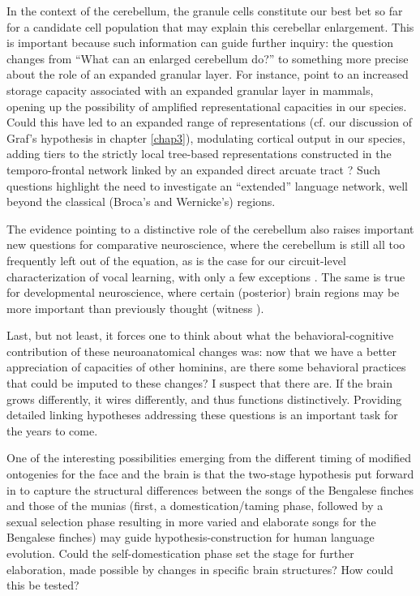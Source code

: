 In the context of the cerebellum, the granule cells constitute our best bet so far for a candidate cell population that may explain this cerebellar enlargement. This is important because such information can guide further inquiry: the question changes from ``What can an enlarged cerebellum do?'' to something more precise about the role of an expanded granular layer. For instance, \cite{straub2020gradients} point to an increased storage capacity associated with an expanded granular layer in mammals, opening up the possibility of amplified representational capacities in our species. Could this have led to an expanded range of representations (cf. our discussion of Graf's hypothesis in chapter \ref{chap3}), modulating cortical output in our species, adding tiers to the strictly local tree-based representations constructed in the temporo-frontal network linked by an expanded direct arcuate tract \citep{rilling2008evolution,friederici2017language,eichert2019special,balezeau2020primate}? Such questions highlight the need to investigate an ``extended'' language network, well beyond the classical (Broca's and Wernicke's) regions.

The evidence pointing to a distinctive role of the cerebellum also raises important new questions for comparative neuroscience, where the cerebellum is still all too frequently left out of the equation, as is the case for our circuit-level characterization of vocal learning, with only a few exceptions \citep{pidoux2018subcortical,Hoeksema2020.12.19.423579,wirthlin2018parrot,gutierrez2018parrots}. The same is true for developmental neuroscience, where certain (posterior) brain regions may be more important than previously thought (witness \cite{orpella2020integrating,irurtzun2015globularization}).

Last, but not least, it forces one to think about what the behavioral-cognitive contribution of these neuroanatomical changes was: now that we have a better appreciation of capacities of other hominins, are there some behavioral practices that could be imputed to these changes? I suspect that there are. If the brain grows differently, it wires differently, and thus functions distinctively. Providing detailed linking hypotheses addressing these questions is an important task for the years to come.

One of the interesting possibilities emerging from the different timing of modified ontogenies for the face and the brain is that the two-stage hypothesis put forward in \citep{okanoya2017sexual} to capture the structural differences between the songs of the Bengalese finches and those of the munias (first, a domestication/taming phase, followed by a sexual selection phase resulting in more varied and elaborate songs for the Bengalese finches) may guide hypothesis-construction for human language evolution. Could the self-domestication phase set the stage for further elaboration, made possible by changes in specific brain structures? How could this be tested?

